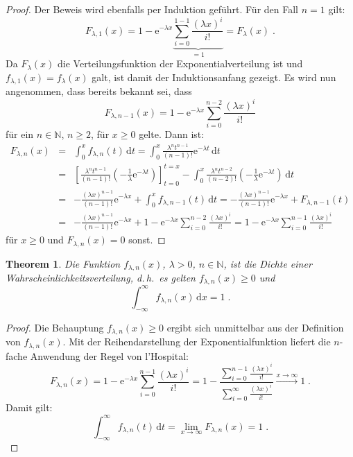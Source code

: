 \documentclass[a4paper,11pt,oneside]{article}
\newtheorem{theorem}{Theorem}
\theoremstyle{definition}
\begin{document}
\begin{proof}
Der Beweis wird ebenfalls per Induktion geführt. Für den Fall $n=1$ gilt:
$$
F_{\lambda,1}(x)=1-\mathrm{e}^{-\lambda x}\underbrace{\sum_{i=0}^{1-1}\frac{(\lambda x)^i}{i!}}_{=1}=F_{\lambda}(x)\;.
$$
Da $F_{\lambda}(x)$ die Verteilungsfunktion der Exponentialverteilung ist und $f_{\lambda,1}(x)=f_\lambda(x)$ galt, ist damit der Induktionsanfang gezeigt. Es wird nun angenommen, dass bereits bekannt sei, dass
$$
F_{\lambda,n-1}(x)=1-\mathrm{e}^{-\lambda x}\sum_{i=0}^{n-2}\frac{(\lambda x)^i}{i!}
$$
für ein $n\in\mathbb{N}$, $n\ge2$, für $x\ge0$ gelte. Dann ist:
\begin{eqnarray*}
F_{\lambda,n}(x)&=&
\int_0^x f_{\lambda,n}(t)\,\mbox{d}t=
\int_0^x \frac{\lambda^n t^{n-1}}{(n-1)!}\mathrm{e}^{-\lambda t}\,\mbox{d}t\\&=&
\left[\frac{\lambda^n t^{n-1}}{(n-1)!}\left(-\frac{1}{\lambda}\mathrm{e}^{-\lambda t}\right)\right]_{t=0}^{t=x}-\int_0^x\frac{\lambda^n t^{n-2}}{(n-2)!}\left(-\frac{1}{\lambda}\mathrm{e}^{-\lambda t}\right)\,\mbox{d}t\\&=&
-\frac{(\lambda x)^{n-1}}{(n-1)!}\mathrm{e}^{-\lambda x}+\int_0^x f_{\lambda,n-1}(t)\,\mbox{d}t=
-\frac{(\lambda x)^{n-1}}{(n-1)!}\mathrm{e}^{-\lambda x}+F_{\lambda,n-1}(t)\\&=&
-\frac{(\lambda x)^{n-1}}{(n-1)!}\mathrm{e}^{-\lambda x}+1-\mathrm{e}^{-\lambda x}\sum_{i=0}^{n-2}\frac{(\lambda x)^i}{i!}=
1-\mathrm{e}^{-\lambda x}\sum_{i=0}^{n-1}\frac{(\lambda x)^i}{i!}
\end{eqnarray*}
für $x\ge0$ und $F_{\lambda,n}(x)=0$ sonst.
\end{proof}

\begin{theorem}
Die Funktion $f_{\lambda,n}(x)$, $\lambda>0$, $n\in\mathbb{N}$, ist die Dichte einer Wahrscheinlichkeitsverteilung, d.\,h.\ es gelten $f_{\lambda,n}(x)\ge0$ und
$$
\int_{-\infty}^\infty f_{\lambda,n}(x)\,\mbox{d}x=1\;.
$$
\end{theorem}

\begin{proof}
Die Behauptung $f_{\lambda,n}(x)\ge0$ ergibt sich unmittelbar aus der Definition von $f_{\lambda,n}(x)$. Mit der Reihendarstellung der Exponentialfunktion liefert die $n$-fache Anwendung der Regel von l'Hospital:
$$
F_{\lambda,n}(x)=
1-\mathrm{e}^{-\lambda x}\sum_{i=0}^{n-1}\frac{(\lambda x)^i}{i!}=
1-\frac{\sum_{i=0}^{n-1}\frac{(\lambda x)^i}{i!}}{\sum_{i=0}^{\infty}\frac{(\lambda x)^i}{i!}}
\mathop{\longrightarrow}\limits^{x\to\infty}1\;.
$$
Damit gilt:
$$
\int_{-\infty}^\infty f_{\lambda,n}(t)\,\mbox{d}t=
\lim_{x\to\infty}F_{\lambda,n}(x)=1\;.
$$
\end{proof}
\end{document}
